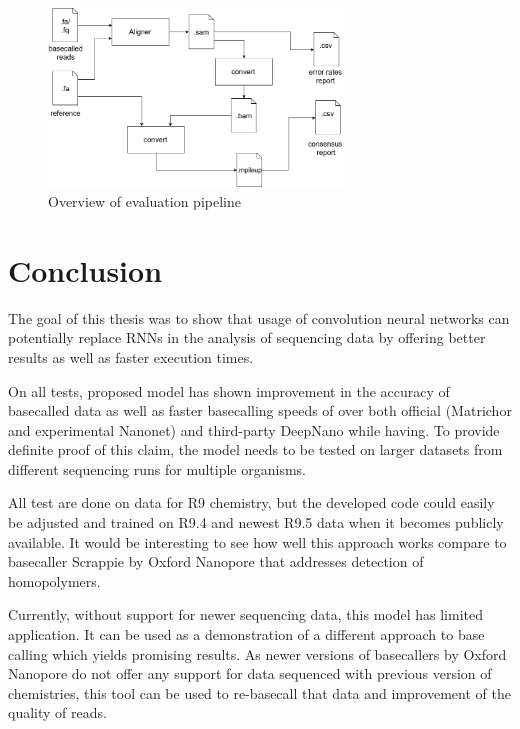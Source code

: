\documentclass[times, utf8, diplomski, numeric, english]{fer}
\begin{document}
\begin{figure}[!ht]
	\begin{center}
		\includegraphics[width=0.7\textwidth]{./imgs/evaluation_pipeline.png}
		\caption{Overview of evaluation pipeline}
		\label{fg:eval_pipe}
	\end{center}
\end{figure}

\chapter{Conclusion}



The goal of this thesis was to show that usage of convolution neural networks can potentially replace RNNs in the analysis of sequencing data by offering better results as well as faster execution times.

On all tests, proposed model has shown improvement in the accuracy of basecalled data as well as faster basecalling speeds of over both official (Matrichor and experimental Nanonet) and  third-party DeepNano while having. 
To provide definite proof of this claim, the model needs to be tested on larger datasets from different sequencing runs for multiple organisms.

All test are done on data for R9 chemistry, but the developed code could easily be adjusted and trained on R9.4 and newest R9.5 data when it becomes publicly available.
It would be interesting to see how well this approach works compare to basecaller Scrappie by Oxford Nanopore that addresses detection of homopolymers.

Currently, without support for newer sequencing data, this model has limited application. 
It can be used as a demonstration of a different approach to base calling which yields promising results.  As newer versions of basecallers by Oxford Nanopore do not offer any support for data sequenced with previous version of chemistries, this tool can be used to re-basecall that data and improvement of the quality of reads.
\end{document}
